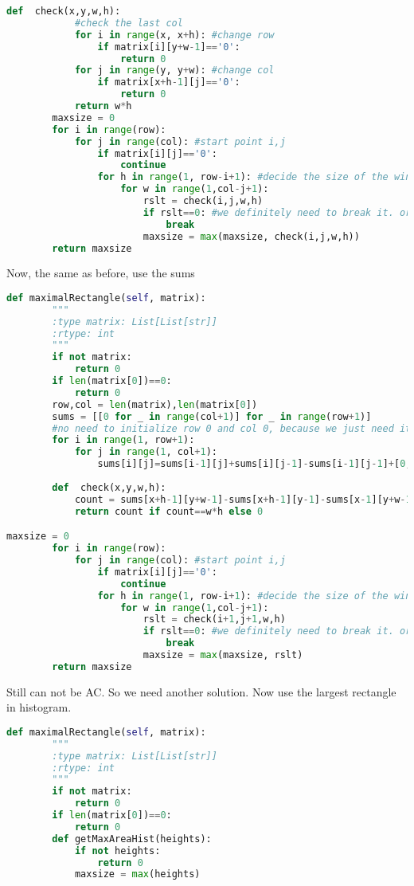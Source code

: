 \documentclass[../main.tex]{subfiles}
\begin{document}
\begin{examples}[resume]
\begin{lstlisting}[language = Python]
        def  check(x,y,w,h):
            #check the last col
            for i in range(x, x+h): #change row
                if matrix[i][y+w-1]=='0':
                    return 0               
            for j in range(y, y+w): #change col
                if matrix[x+h-1][j]=='0':
                    return 0
            return w*h
        maxsize = 0
        for i in range(row):
            for j in range(col): #start point i,j
                if matrix[i][j]=='0':
                    continue
                for h in range(1, row-i+1): #decide the size of the window
                    for w in range(1,col-j+1):
                        rslt = check(i,j,w,h)
                        if rslt==0: #we definitely need to break it. or else we get wrong result
                            break
                        maxsize = max(maxsize, check(i,j,w,h))
        return maxsize
\end{lstlisting}
Now, the same as before, use the sums
\begin{lstlisting}[language = Python]
def maximalRectangle(self, matrix):
        """
        :type matrix: List[List[str]]
        :rtype: int
        """
        if not matrix:
            return 0
        if len(matrix[0])==0:
            return 0
        row,col = len(matrix),len(matrix[0])
        sums = [[0 for _ in range(col+1)] for _ in range(row+1)]
        #no need to initialize row 0 and col 0, because we just need it to be 0
        for i in range(1, row+1):
            for j in range(1, col+1):
                sums[i][j]=sums[i-1][j]+sums[i][j-1]-sums[i-1][j-1]+[0,1][matrix[i-1][j-1]=='1']
        
        def  check(x,y,w,h):
            count = sums[x+h-1][y+w-1]-sums[x+h-1][y-1]-sums[x-1][y+w-1]+sums[x-1][y-1]
            return count if count==w*h else 0

maxsize = 0
        for i in range(row):
            for j in range(col): #start point i,j
                if matrix[i][j]=='0':
                    continue
                for h in range(1, row-i+1): #decide the size of the window
                    for w in range(1,col-j+1):
                        rslt = check(i+1,j+1,w,h)
                        if rslt==0: #we definitely need to break it. or else we get wrong result
                            break
                        maxsize = max(maxsize, rslt)
        return maxsize
\end{lstlisting}
Still can not be AC. So we need another solution. Now use the largest rectangle in histogram.
\begin{lstlisting}[language = Python]
def maximalRectangle(self, matrix):
        """
        :type matrix: List[List[str]]
        :rtype: int
        """
        if not matrix:
            return 0
        if len(matrix[0])==0:
            return 0
        def getMaxAreaHist(heights):
            if not heights:
                return 0
            maxsize = max(heights)


\end{lstlisting}
\end{examples}
\end{document}
